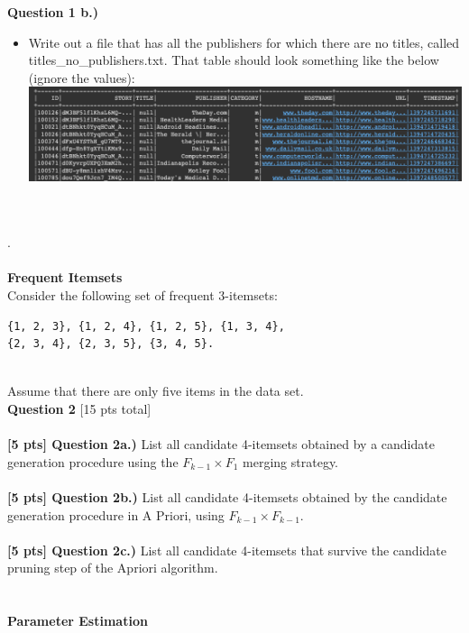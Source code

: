\documentclass[paper=a4, fontsize=11pt]{scrartcl} %
\begin{document}
\textbf{Question 1 b.)}
\begin{itemize}
    \item Write out a file that has all the publishers for which there are no titles, called titles\_no\_publishers.txt. That table should look something like the below (ignore the values): \\
    \includegraphics[width=150mm]{images/title_no_pub.png}
\end{itemize} \\
\\
.\\
\\
{\huge \textbf{Frequent Itemsets}} \\

Consider the following set of frequent 3-itemsets:

\begin{verbatim}
{1, 2, 3}, {1, 2, 4}, {1, 2, 5}, {1, 3, 4}, 
{2, 3, 4}, {2, 3, 5}, {3, 4, 5}.
\end{verbatim} \\

Assume that there are only five items in the data set. \\

{\Large \textbf{Question 2} [15 pts total]} \\
\\
\textbf{[5 pts] Question 2a.)} List all candidate 4-itemsets obtained by a candidate generation procedure using the $F_{k - 1} \times F_1$ merging strategy. \\
\\
\textbf{[5 pts] Question 2b.)} List all candidate 4-itemsets obtained by the candidate generation procedure in A Priori, using $F_{k-1} \times F_{k-1}$. \\
\\
\textbf{[5 pts] Question 2c.)} List all candidate 4-itemsets that survive the candidate pruning step of
the Apriori algorithm. \\
\\
\\
{\huge \textbf{Parameter Estimation}} \\
\end{document}

